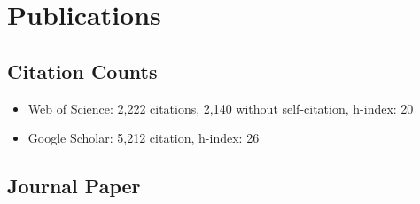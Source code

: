 \documentclass[10pt, a4paper]{article}
\begin{document}
\section*{Publications}

\subsection*{Citation Counts}
\begin{itemize}
\item Web of Science: 2,222 citations, 2,140 without self-citation, h-index: 20
\item Google Scholar: 5,212 citation, h-index: 26
\end{itemize}
\subsection*{Journal Paper}
\label{sec:org97ece48}
\end{document}

